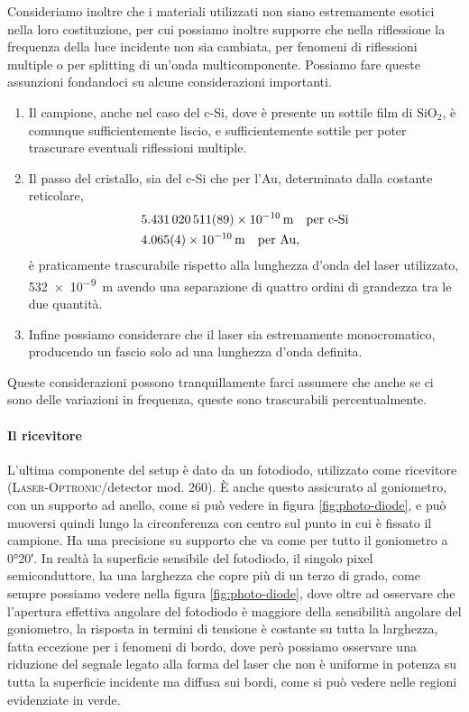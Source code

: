 \documentclass[
    prb,altaffilletter,citeautoscript,
    amsmath,amssymb,
    showpacs,showkeys,floatfix,
    reprint
]{revtex4-1}
\begin{document}
Consideriamo inoltre che i materiali utilizzati non siano estremamente esotici nella loro costituzione, per cui possiamo inoltre supporre che nella riflessione la frequenza della luce incidente non sia cambiata, per fenomeni di riflessioni multiple o per splitting di un'onda multicomponente. Possiamo fare queste assunzioni fondandoci su alcune considerazioni importanti.
\begin{enumerate}
    \item Il campione, anche nel caso del c-Si, dove è presente un sottile film di $\mathrm{SiO_2}$, è comunque sufficientemente liscio, e sufficientemente sottile per poter trascurare eventuali riflessioni multiple. 
    \item Il passo del cristallo, sia del c-Si che per l'Au, determinato dalla costante reticolare,\cite{BasicParametersSilicon2023, CODATAValueLattice, daveyPrecisionMeasurementsLattice1925, MaterialsDataAu2020, MaterialsDataSi2020, NSMArchivePhysical} \begin{align*}
        &\SI{5.431 020 511(89)e-10}{\metre}\quad\text{per c-Si}\\
        &\SI{4.065+-0.004e-10}{\metre}\quad\text{per Au},
    \end{align*} è praticamente trascurabile rispetto alla lunghezza d'onda del laser utilizzato, \SI{532e-9}{\metre} avendo una separazione di quattro ordini di grandezza tra le due quantità.
    \item Infine possiamo considerare che il laser sia estremamente monocromatico, producendo un fascio solo ad una lunghezza d'onda definita. 
\end{enumerate} Queste considerazioni possono tranquillamente farci assumere che anche se ci sono delle variazioni in frequenza, queste sono trascurabili percentualmente. 

\paragraph*{Il ricevitore} L'ultima componente del setup è dato da un fotodiodo, utilizzato come ricevitore (\textsc{Laser-Optronic}/detector mod. 260). È anche questo assicurato al goniometro, con un supporto ad anello, come si può vedere in figura \ref{fig:photo-diode}, e può muoversi quindi lungo la circonferenza con centro sul punto in cui è fissato il campione. Ha una precisione su supporto che va come per tutto il goniometro a \ang{0;20}. In realtà la superficie sensibile del fotodiodo, il singolo pixel semiconduttore, ha una larghezza che copre più di un terzo di grado, come sempre possiamo vedere nella figura \ref{fig:photo-diode}, dove oltre ad osservare che l'apertura effettiva angolare del fotodiodo è maggiore della sensibilità angolare del goniometro, la risposta in termini di tensione è costante su tutta la larghezza, fatta eccezione per i fenomeni di bordo, dove però possiamo osservare una riduzione del segnale legato alla forma del laser che non è uniforme in potenza su tutta la superficie incidente ma diffusa sui bordi, come si può vedere nelle regioni evidenziate in verde. 
\end{document}
